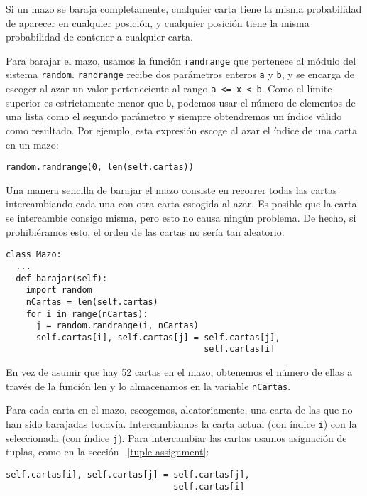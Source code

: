 Si un mazo se baraja completamente, cualquier carta tiene la misma probabilidad
de aparecer en cualquier posición, y cualquier posición tiene la misma
probabilidad de contener a cualquier carta.


Para barajar el mazo, usamos la función  \texttt{randrange} que pertenece
al módulo del sistema  \texttt{random}.  \texttt{randrange} recibe dos parámetros enteros
\texttt{a} y \texttt{b}, y se encarga de escoger al azar un valor 
perteneciente al rango \texttt{a <= x < b}.  Como el límite superior es 
estrictamente menor que \texttt{b}, podemos usar el número de elementos
de una lista como el segundo parámetro y siempre obtendremos un índice válido
como resultado. Por ejemplo, esta expresión escoge al azar el índice de una carta en un mazo:

\beforeverb
\begin{verbatim}
random.randrange(0, len(self.cartas))
\end{verbatim}
\afterverb
%
Una manera sencilla de barajar el mazo consiste en recorrer todas las cartas 
intercambiando cada una con otra carta escogida al azar. Es posible que
la carta se intercambie consigo misma, pero esto no causa ningún problema. De
hecho, si prohibiéramos esto, el orden de las cartas no sería tan aleatorio:



\beforeverb
\begin{verbatim}
class Mazo:
  ...
  def barajar(self):
    import random
    nCartas = len(self.cartas)
    for i in range(nCartas):
      j = random.randrange(i, nCartas)
      self.cartas[i], self.cartas[j] = self.cartas[j], 
                                       self.cartas[i]
\end{verbatim}
\afterverb
%
En vez de asumir que hay 52 cartas en el mazo, obtenemos el número de ellas
a través de la función len y lo almacenamos en la variable  \texttt{nCartas}.


Para cada carta en el mazo, escogemos, aleatoriamente, una carta de las
que no han sido barajadas todavía. Intercambiamos la carta actual (con índice
\texttt{i}) con la seleccionada (con índice \texttt{j}).  Para intercambiar
las cartas usamos asignación de tuplas, como en la sección ~\ref{tuple assignment}:

\beforeverb
\begin{verbatim}
self.cartas[i], self.cartas[j] = self.cartas[j], 
                                 self.cartas[i]
\end{verbatim}
\afterverb
%

